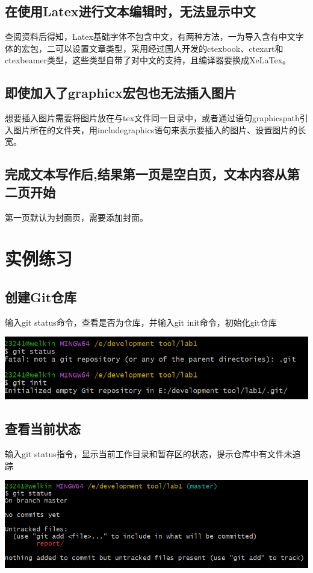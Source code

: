 \documentclass[UTF8,a4paper]{ctexart}
\begin{document}
\begin{sloppypar}
	\subsection{在使用Latex进行文本编辑时，无法显示中文}
	查阅资料后得知，Latex基础字体不包含中文，有两种方法，一为导入含有中文字体的宏包，二可以设置文章类型，采用经过国人开发的ctexbook、ctexart和ctexbeamer类型，这些类型自带了对中文的支持，且编译器要换成XeLaTex。
	\subsection{即使加入了graphicx宏包也无法插入图片}
	想要插入图片需要将图片放在与tex文件同一目录中，或者通过语句graphicspath引入图片所在的文件夹，用includegraphics语句来表示要插入的图片、设置图片的长宽。
	\subsection{完成文本写作后,结果第一页是空白页，文本内容从第二页开始}
	第一页默认为封面页，需要添加封面。
	
			\bigskip
			\bigskip
			\bigskip
			\bigskip
			
	\graphicspath{{picture/}}
	\section{实例练习}
	\subsection{创建Git仓库}
	输入git status命令，查看是否为仓库，并输入git init命令，初始化git仓库
	
	\includegraphics[width = 16cm]{1}
	
	\subsection{查看当前状态}
	输入git status指令，显示当前工作目录和暂存区的状态，提示仓库中有文件未追踪
	
	\includegraphics[width = 16cm]{2}
	

\end{sloppypar}
\end{document}
